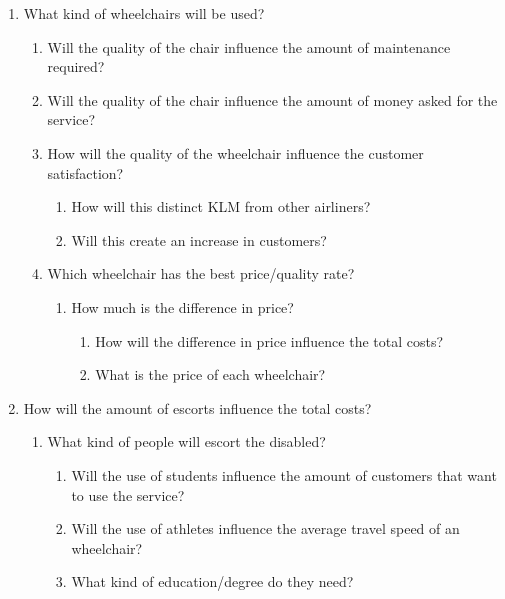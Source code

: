 \documentclass[a4paper, 11pt, notitlepage]{report}
\begin{document}
\begin{enumerate}
\begin{enumerate}
	\end{enumerate}
\item What kind of wheelchairs will be used?
	\begin{enumerate}
	\item Will the quality of the chair influence the amount of maintenance required?
	\item Will the quality of the chair influence the amount of money asked for the service?
	\item How will the quality of the wheelchair influence the customer satisfaction?
		\begin{enumerate}
		\item How will this distinct KLM from other airliners?
		\item Will this create an increase in customers?
		\end{enumerate}
	\item Which wheelchair has the best price/quality rate?
		\begin{enumerate}
		\item How much is the difference in price?
			\begin{enumerate}
			\item How will the difference in price influence the total costs?
			\item What is the price of each wheelchair?
			\end{enumerate}
		\end{enumerate}
	\end{enumerate}
\item How will the amount of escorts influence the total costs?
	\begin{enumerate}
	\item What kind of people will escort the disabled?
		\begin{enumerate}
		\item Will the use of students influence the amount of customers that want to use the service?
		\item Will the use of athletes influence the average travel speed of an wheelchair?
		\item What kind of education/degree do they need?


\end{enumerate}
\end{enumerate}
\end{enumerate}
\end{document}
